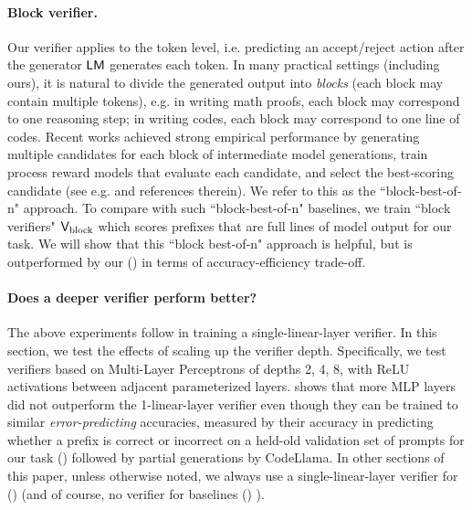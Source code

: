 \paragraph{Block verifier.}
Our verifier applies to the token level,
i.e. predicting an accept/reject action after the generator $\mathsf{LM}$ generates each token.
In many practical settings (including ours),
it is natural to divide the generated output into \emph{blocks} 
(each block may contain multiple tokens),
e.g. in writing math proofs, each block may correspond to one reasoning step;
in writing codes, each block may correspond to one line of codes.
Recent works achieved strong empirical performance by 
generating multiple candidates for each block of intermediate model generations,
train process reward models that evaluate each candidate,
and select the best-scoring candidate
(see e.g. \citet{wu2024inference} and references therein).
We refer to this as the ``block-best-of-n" approach.
To compare with such ``block-best-of-n" baselines,
we train ``block verifiers" $\mathsf{V}_{\text{block}}$ which scores prefixes that are full lines of model output for our task.
We will show that this ``block best-of-n" approach is helpful, 
but is outperformed by our \algoName ()
in terms of accuracy-efficiency trade-off.

\paragraph{Does a deeper verifier perform better?}

The above experiments follow  in training a single-linear-layer verifier.
In this section,
we test the effects of scaling up the verifier depth.
Specifically, we test verifiers based on Multi-Layer Perceptrons \citep{rosenblatt1958perceptron} of depths 2, 4, 8,
with ReLU activations \citep{nair2010rectified} between adjacent parameterized layers.
 shows that more MLP layers did not outperform the 1-linear-layer verifier
even though they can be trained to similar \emph{error-predicting} accuracies,
measured by their accuracy in predicting whether a prefix is correct or incorrect
on a held-old validation set of prompts for our task ()
followed by partial generations by CodeLlama.
In other sections of this paper, unless otherwise noted, we always use a single-linear-layer verifier for \algoName ()
(and of course, no verifier for baselines () ).

